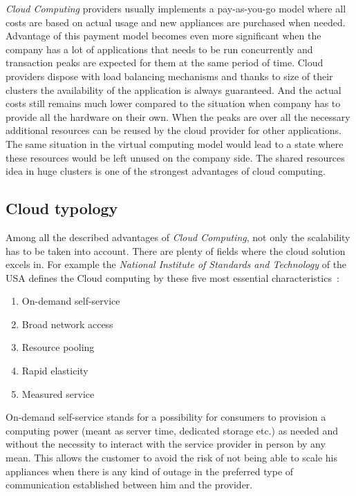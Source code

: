 \emph{Cloud Computing} providers usually implements a pay-as-you-go model where all costs are based on actual usage and new appliances are purchased when needed. Advantage of this payment model becomes even more significant when the company has a lot of applications that needs to be run concurrently and transaction peaks are expected for them at the same period of time. Cloud providers dispose with load balancing mechanisms and thanks to size of their clusters the availability of the application is always guaranteed. And the actual costs still remains much lower compared to the situation when company has to provide all the hardware on their own. When the peaks are over all the necessary additional resources can be reused by the cloud provider for other applications. The same situation in the virtual computing model would lead to a state where these resources would be left unused on the company side. The shared resources idea in huge clusters is one of the strongest advantages of cloud computing.

\subsection{Cloud typology}
\label{sub:Cloud typology}

Among all the described advantages of \emph{Cloud Computing}, not only the scalability has to be taken into account. There are plenty of fields where the cloud solution excels in. For example the \emph{National Institute of Standards and Technology} of the USA defines the Cloud computing by these five most essential characteristics~\cite{hu}:

\begin{enumerate}
	\item On-demand self-service
	\item Broad network access
	\item Resource pooling
	\item Rapid elasticity
	\item Measured service
\end{enumerate}

On-demand self-service stands for a possibility for consumers to provision a computing power (meant as server time, dedicated storage etc.) as needed and without the necessity to interact with the service provider in person by any mean. This allows the customer to avoid the risk of not being able to scale his appliances when there is any kind of outage in the preferred type of communication established between him and the provider.

